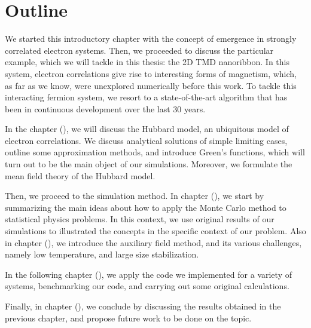 \section{Outline}
\label{sec:int_outline}

We started this introductory chapter with the concept of emergence in strongly correlated electron systems.
Then, we proceeded to discuss the particular example, which we will tackle in this thesis: the \acs{2D} \acs{TMD} nanoribbon.
In this system, electron correlations give rise to interesting forms of magnetism, which, as far as we know, were unexplored numerically before this work.
To tackle this interacting fermion system, we resort to a  state-of-the-art algorithm that has been in continuous development over the last 30 years.

In the chapter (), we will discuss the Hubbard model, an ubiquitous model of electron correlations.
We discuss analytical solutions of simple limiting cases, outline some approximation methods, and introduce Green's functions, which will turn out to be the main object of our simulations.
Moreover, we formulate the mean field theory of the Hubbard model.

Then, we proceed to the simulation method.
In chapter (), we start by summarizing the main ideas about how to apply the Monte Carlo method to statistical physics problems.
In this context, we use original results of our simulations to illustrated the concepts in the specific context of our problem.
Also in chapter (), we introduce the auxiliary field method, and its various challenges, namely low temperature, and large size stabilization.

In the following chapter (), we apply the code we implemented for a variety of systems, benchmarking our code, and carrying out some original calculations.

Finally, in chapter (), we conclude by discussing the results obtained in the previous chapter, and propose future work to be done on the topic.